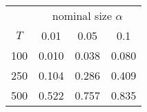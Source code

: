 % 
\begin{tabular}{cccc}
  \hline
  & \multicolumn{3}{c}{nominal size $\alpha$} \\
 $T$ & 0.01 & 0.05 & 0.1 \\
 \hline
100 & 0.010 & 0.038 & 0.080 \\ 
  250 & 0.104 & 0.286 & 0.409 \\ 
  500 & 0.522 & 0.757 & 0.835 \\ 
   \hline
\end{tabular}
